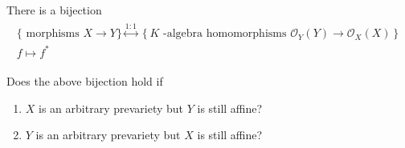 \begin{proposition}[?]

There is a bijection
\begin{align*}
\begin{array}{c}
\{\text { morphisms } X \rightarrow Y\} \stackrel{1: 1}{\longleftrightarrow}\left\{K \text { -algebra homomorphisms } \mathscr{O}_{Y}(Y) \rightarrow \mathscr{O}_{X}(X)\right\} \\
f \longmapsto f^{*}
\end{array}
\end{align*}

\end{proposition}

\begin{problem}[Gathmann 5.9]

Does the above bijection hold if

\begin{enumerate}
\def\labelenumi{\alph{enumi}.}
\tightlist
\item
  \(X\) is an arbitrary prevariety but \(Y\) is still affine?
\item
  \(Y\) is an arbitrary prevariety but \(X\) is still affine?
\end{enumerate}

\end{problem}





